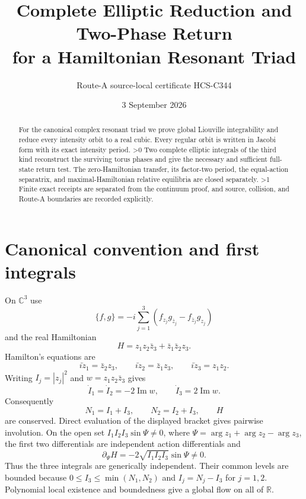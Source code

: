 \documentclass[10pt]{article}
\title{Complete Elliptic Reduction and Two-Phase Return\\for a Hamiltonian Resonant Triad}
\author{Route-A source-local certificate HCS-C344}
\date{3 September 2026}
\providecommand{\CRevisionRound}{2}
\newcommand{\CC}{\mathbb C}
\newcommand{\RR}{\mathbb R}
\begin{document}
\maketitle
\begin{abstract}
For the canonical complex resonant triad we prove global Liouville
integrability and reduce every intensity orbit to a real cubic.  Every
regular orbit is written in Jacobi form with its exact intensity period.
\ifnum\CRevisionRound>0
Two complete elliptic integrals of the third kind reconstruct the surviving
torus phases and give the necessary and sufficient full-state return test.
The zero-Hamiltonian transfer, its factor-two period, the equal-action
separatrix, and maximal-Hamiltonian relative equilibria are closed separately.
\fi
\ifnum\CRevisionRound>1
Finite exact receipts are separated from the continuum proof, and source,
collision, and Route-A boundaries are recorded explicitly.
\fi
\end{abstract}

\section{Canonical convention and first integrals}
On $\CC^3$ use
\[
 \{f,g\}=-i\sum_{j=1}^3
 \left(f_{z_j}g_{\bar z_j}-f_{\bar z_j}g_{z_j}\right)
\]
and the real Hamiltonian
\begin{equation}\label{eq:H}
 H=z_1z_2\bar z_3+\bar z_1\bar z_2z_3.
\end{equation}
Hamilton's equations are
\begin{equation}\label{eq:triad}
 i\dot z_1=\bar z_2z_3,\qquad
 i\dot z_2=\bar z_1z_3,\qquad
 i\dot z_3=z_1z_2.
\end{equation}
Writing $I_j=|z_j|^2$ and $w=z_1z_2\bar z_3$ gives
\[
 \dot I_1=\dot I_2=-2\operatorname{Im}w,\qquad
 \dot I_3=2\operatorname{Im}w.
\]
Consequently
\begin{equation}\label{eq:MR}
 N_1=I_1+I_3,\qquad N_2=I_2+I_3,\qquad H
\end{equation}
are conserved.  Direct evaluation of the displayed bracket gives pairwise
involution.  On the open set $I_1I_2I_3\sin\Psi\ne0$, where
$\Psi=\arg z_1+\arg z_2-\arg z_3$, the first two differentials are
independent action differentials and
\[
 \partial_\Psi H=-2\sqrt{I_1I_2I_3}\sin\Psi\ne0.
\]
Thus the three integrals are generically independent.  Their common levels
are bounded because $0\le I_3\le\min(N_1,N_2)$ and
$I_j=N_j-I_3$ for $j=1,2$.  Polynomial local existence and boundedness give
a global flow on all of $\RR$.
\end{document}
